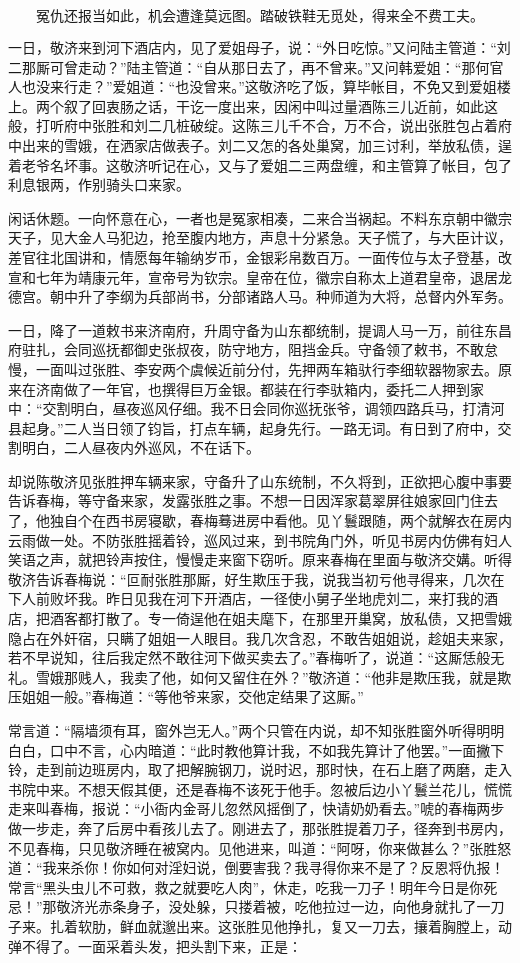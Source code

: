 \[
冤仇还报当如此，机会遭逢莫远图。
踏破铁鞋无觅处，得来全不费工夫。
\]

一日，敬济来到河下酒店内，见了爱姐母子，说：“外日吃惊。”又问陆主管道：“刘二那厮可曾走动？”陆主管道：“自从那日去了，再不曾来。”又问韩爱姐：“那何官人也没来行走？”爱姐道：“也没曾来。”这敬济吃了饭，算毕帐目，不免又到爱姐楼上。两个叙了回衷肠之话，干讫一度出来，因闲中叫过量酒陈三儿近前，如此这般，打听府中张胜和刘二几桩破绽。这陈三儿千不合，万不合，说出张胜包占着府中出来的雪娥，在洒家店做表子。刘二又怎的各处巢窝，加三讨利，举放私债，逞着老爷名坏事。这敬济听记在心，又与了爱姐二三两盘缠，和主管算了帐目，包了利息银两，作别骑头口来家。

闲话休题。一向怀意在心，一者也是冤家相凑，二来合当祸起。不料东京朝中徽宗天子，见大金人马犯边，抢至腹内地方，声息十分紧急。天子慌了，与大臣计议，差官往北国讲和，情愿每年输纳岁币，金银彩帛数百万。一面传位与太子登基，改宣和七年为靖康元年，宣帝号为钦宗。皇帝在位，徽宗自称太上道君皇帝，退居龙德宫。朝中升了李纲为兵部尚书，分部诸路人马。种师道为大将，总督内外军务。

一日，降了一道敕书来济南府，升周守备为山东都统制，提调人马一万，前往东昌府驻扎，会同巡抚都御史张叔夜，防守地方，阻挡金兵。守备领了敕书，不敢怠慢，一面叫过张胜、李安两个虞候近前分付，先押两车箱驮行李细软器物家去。原来在济南做了一年官，也撰得巨万金银。都装在行李驮箱内，委托二人押到家中：“交割明白，昼夜巡风仔细。我不日会同你巡抚张爷，调领四路兵马，打清河县起身。”二人当日领了钧旨，打点车辆，起身先行。一路无词。有日到了府中，交割明白，二人昼夜内外巡风，不在话下。

却说陈敬济见张胜押车辆来家，守备升了山东统制，不久将到，正欲把心腹中事要告诉春梅，等守备来家，发露张胜之事。不想一日因浑家葛翠屏往娘家回门住去了，他独自个在西书房寝歇，春梅蓦进房中看他。见丫鬟跟随，两个就解衣在房内云雨做一处。不防张胜摇着铃，巡风过来，到书院角门外，听见书房内仿佛有妇人笑语之声，就把铃声按住，慢慢走来窗下窃听。原来春梅在里面与敬济交媾。听得敬济告诉春梅说：“叵耐张胜那厮，好生欺压于我，说我当初亏他寻得来，几次在下人前败坏我。昨日见我在河下开酒店，一径使小舅子坐地虎刘二，来打我的酒店，把酒客都打散了。专一倚逞他在姐夫麾下，在那里开巢窝，放私债，又把雪娥隐占在外奸宿，只瞒了姐姐一人眼目。我几次含忍，不敢告姐姐说，趁姐夫来家，若不早说知，往后我定然不敢往河下做买卖去了。”春梅听了，说道：“这厮恁般无礼。雪娥那贱人，我卖了他，如何又留住在外？”敬济道：“他非是欺压我，就是欺压姐姐一般。”春梅道：“等他爷来家，交他定结果了这厮。”

常言道：“隔墙须有耳，窗外岂无人。”两个只管在内说，却不知张胜窗外听得明明白白，口中不言，心内暗道：“此时教他算计我，不如我先算计了他罢。”一面撇下铃，走到前边班房内，取了把解腕钢刀，说时迟，那时快，在石上磨了两磨，走入书院中来。不想天假其便，还是春梅不该死于他手。忽被后边小丫鬟兰花儿，慌慌走来叫春梅，报说：“小衙内金哥儿忽然风摇倒了，快请奶奶看去。”唬的春梅两步做一步走，奔了后房中看孩儿去了。刚进去了，那张胜提着刀子，径奔到书房内，不见春梅，只见敬济睡在被窝内。见他进来，叫道：“阿呀，你来做甚么？”张胜怒道：“我来杀你！你如何对淫妇说，倒要害我？我寻得你来不是了？反恩将仇报！常言“黑头虫儿不可救，救之就要吃人肉”，休走，吃我一刀子！明年今日是你死忌！”那敬济光赤条身子，没处躲，只搂着被，吃他拉过一边，向他身就扎了一刀子来。扎着软肋，鲜血就邈出来。这张胜见他挣扎，复又一刀去，攘着胸膛上，动弹不得了。一面采着头发，把头割下来，正是：

